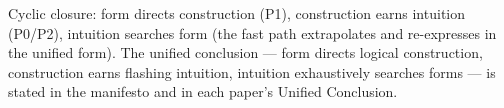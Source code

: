 \documentclass[
]{article}
\begin{document}
Cyclic closure: form directs construction (P1), construction earns
intuition (P0/P2), intuition searches form (the fast path extrapolates
and re-expresses in the unified form). The unified conclusion --- form
directs logical construction, construction earns flashing intuition,
intuition exhaustively searches forms --- is stated in the manifesto and
in each paper's Unified Conclusion.
\end{document}
